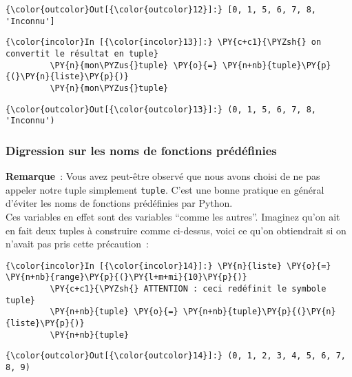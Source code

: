 \begin{Verbatim}[commandchars=\\\{\}]
{\color{outcolor}Out[{\color{outcolor}12}]:} [0, 1, 5, 6, 7, 8, 'Inconnu']
\end{Verbatim}
            
    \begin{Verbatim}[commandchars=\\\{\}]
{\color{incolor}In [{\color{incolor}13}]:} \PY{c+c1}{\PYZsh{} on convertit le résultat en tuple}
         \PY{n}{mon\PYZus{}tuple} \PY{o}{=} \PY{n+nb}{tuple}\PY{p}{(}\PY{n}{liste}\PY{p}{)}
         \PY{n}{mon\PYZus{}tuple}
\end{Verbatim}


\begin{Verbatim}[commandchars=\\\{\}]
{\color{outcolor}Out[{\color{outcolor}13}]:} (0, 1, 5, 6, 7, 8, 'Inconnu')
\end{Verbatim}
            
    \hypertarget{digression-sur-les-noms-de-fonctions-pruxe9duxe9finies}{%
\subsubsection{Digression sur les noms de fonctions
prédéfinies}\label{digression-sur-les-noms-de-fonctions-pruxe9duxe9finies}}

    \textbf{Remarque}~: Vous avez peut-être observé que nous avons choisi de
ne pas appeler notre tuple simplement \texttt{tuple}. C'est une bonne
pratique en général d'éviter les noms de fonctions prédéfinies par
Python.\\

Ces variables en effet sont des variables ``comme les autres''. Imaginez
qu'on ait en fait deux tuples à construire comme ci-dessus, voici ce
qu'on obtiendrait si on n'avait pas pris cette précaution~:

    \begin{Verbatim}[commandchars=\\\{\}]
{\color{incolor}In [{\color{incolor}14}]:} \PY{n}{liste} \PY{o}{=} \PY{n+nb}{range}\PY{p}{(}\PY{l+m+mi}{10}\PY{p}{)}
         \PY{c+c1}{\PYZsh{} ATTENTION : ceci redéfinit le symbole tuple}
         \PY{n+nb}{tuple} \PY{o}{=} \PY{n+nb}{tuple}\PY{p}{(}\PY{n}{liste}\PY{p}{)}
         \PY{n+nb}{tuple}
\end{Verbatim}


\begin{Verbatim}[commandchars=\\\{\}]
{\color{outcolor}Out[{\color{outcolor}14}]:} (0, 1, 2, 3, 4, 5, 6, 7, 8, 9)
\end{Verbatim}
            
